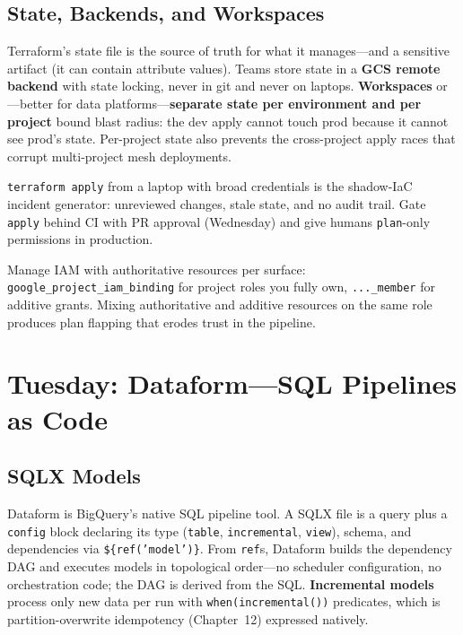 \subsection{State, Backends, and Workspaces}
Terraform's state file is the source of truth for what it manages---and a sensitive artifact (it can contain attribute values). Teams store state in a \textbf{GCS remote backend} with state locking, never in git and never on laptops. \textbf{Workspaces} or---better for data platforms---\textbf{separate state per environment and per project} bound blast radius: the dev apply cannot touch prod because it cannot see prod's state. Per-project state also prevents the cross-project apply races that corrupt multi-project mesh deployments.

\begin{pitfall}
\texttt{terraform apply} from a laptop with broad credentials is the shadow-IaC incident generator: unreviewed changes, stale state, and no audit trail. Gate \texttt{apply} behind CI with PR approval (Wednesday) and give humans \texttt{plan}-only permissions in production.
\end{pitfall}

\begin{tipbox}
Manage IAM with authoritative resources per surface: \texttt{google\_project\_iam\_binding} for project roles you fully own, \texttt{...\_member} for additive grants. Mixing authoritative and additive resources on the same role produces plan flapping that erodes trust in the pipeline.
\end{tipbox}

\section{Tuesday: Dataform---SQL Pipelines as Code}

\subsection{SQLX Models}
Dataform is BigQuery's native SQL pipeline tool. A SQLX file is a query plus a \texttt{config} block declaring its type (\texttt{table}, \texttt{incremental}, \texttt{view}), schema, and dependencies via \texttt{\$\{ref('model')\}}. From \texttt{ref}s, Dataform builds the dependency DAG and executes models in topological order---no scheduler configuration, no orchestration code; the DAG is derived from the SQL. \textbf{Incremental models} process only new data per run with \texttt{when(incremental())} predicates, which is partition-overwrite idempotency (Chapter~12) expressed natively.

